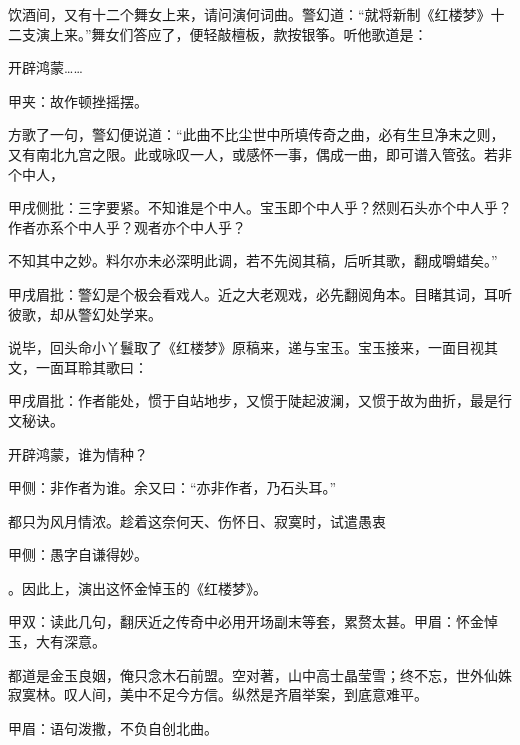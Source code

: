 \begin{parag}


    饮酒间，又有十二个舞女上来，请问演何词曲。警幻道：“就将新制《红楼梦》十二支演上来。”舞女们答应了，便轻敲檀板，款按银筝。听他歌道是：
\end{parag}
\begin{qute}

    开辟鸿蒙……\begin{note}甲夹：故作顿挫摇摆。\end{note}
\end{qute}
\begin{parag}

    方歌了一句，警幻便说道：“此曲不比尘世中所填传奇之曲，必有生旦净末之则，又有南北九宫之限。此或咏叹一人，或感怀一事，偶成一曲，即可谱入管弦。若非个中人，\begin{note}甲戌侧批：三字要紧。不知谁是个中人。宝玉即个中人乎？然则石头亦个中人乎？作者亦系个中人乎？观者亦个中人乎？\end{note}不知其中之妙。料尔亦未必深明此调，若不先阅其稿，后听其歌，翻成嚼蜡矣。”\begin{note}甲戌眉批：警幻是个极会看戏人。近之大老观戏，必先翻阅角本。目睹其词，耳听彼歌，却从警幻处学来。\end{note}说毕，回头命小丫鬟取了《红楼梦》原稿来，递与宝玉。宝玉接来，一面目视其文，一面耳聆其歌曰：\begin{note}甲戌眉批：作者能处，惯于自站地步，又惯于陡起波澜，又惯于故为曲折，最是行文秘诀。\end{note}
\end{parag}
\begin{qute}
    开辟鸿蒙，谁为情种？\begin{note}甲侧：非作者为谁。余又曰：“亦非作者，乃石头耳。”\end{note}都只为风月情浓。趁着这奈何天、伤怀日、寂寞时，试遣愚衷\begin{note}甲侧：愚字自谦得妙。\end{note}。因此上，演出这怀金悼玉的《红楼梦》。\begin{note}甲双：读此几句，翻厌近之传奇中必用开场副末等套，累赘太甚。甲眉：怀金悼玉，大有深意。\end{note}
\end{qute}
\begin{qute}
    都道是金玉良姻，俺只念木石前盟。空对著，山中高士晶莹雪；终不忘，世外仙姝寂寞林。叹人间，美中不足今方信。纵然是齐眉举案，到底意难平。\begin{note}甲眉：语句泼撒，不负自创北曲。\end{note}
\end{qute}
